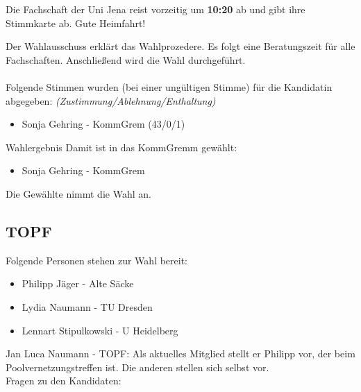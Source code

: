     \begin{info}{}
      Die Fachschaft der Uni Jena reist vorzeitig um \textbf{10:20} ab und gibt ihre Stimmkarte ab. Gute Heimfahrt!
    \end{info}

    Der Wahlausschuss erklärt das Wahlprozedere.
    Es folgt eine Beratungszeit für alle Fachschaften. Anschließend wird die Wahl durchgeführt. \\ \\

    Folgende Stimmen wurden (bei einer ungültigen Stimme) für die Kandidatin abgegeben: \textit{(Zustimmung/Ablehnung/Enthaltung)}
    \begin{itemize}
      \item Sonja Gehring - KommGrem  (43/0/1)
    \end{itemize}

    \begin{success}{Wahlergebnis}
      Damit ist in das KommGremm gewählt:
      \begin{itemize}
        \item Sonja Gehring - KommGrem
      \end{itemize}
      \tcblower
      Die Gewählte nimmt die Wahl an.
    \end{success}

  \subsection{TOPF}
    Folgende Personen stehen zur Wahl bereit:
    \begin{itemize}
      \item Philipp Jäger - Alte Säcke
      \item Lydia Naumann - TU Dresden
      \item Lennart Stipulkowski - U Heidelberg
    \end{itemize}
    Jan Luca Naumann - TOPF:  Als aktuelles Mitglied stellt er Philipp vor, der beim Poolvernetzungstreffen ist. Die anderen stellen sich selbst vor. \\ Fragen zu den Kandidaten:

